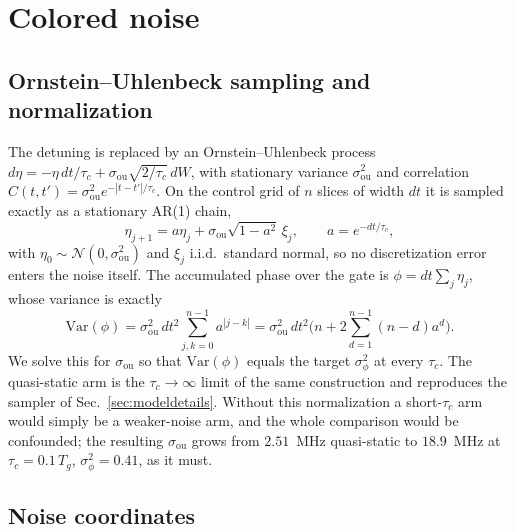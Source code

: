 \documentclass[aps,pra,onecolumn,notitlepage,superscriptaddress,nofootinbib,floatfix]{revtex4-2}
\begin{document}
\section{Colored noise}
\label{sec:stage4}

\subsection{Ornstein--Uhlenbeck sampling and normalization}

The detuning is replaced by an Ornstein--Uhlenbeck process
$d\eta=-\eta\,dt/\tau_c+\sigma_{\mathrm{ou}}\sqrt{2/\tau_c}\,dW$, with
stationary variance $\sigma_{\mathrm{ou}}^2$ and correlation
$C(t,t')=\sigma_{\mathrm{ou}}^2e^{-|t-t'|/\tau_c}$. On the control grid of
$n$ slices of width $dt$ it is sampled exactly as a stationary AR(1) chain,
\begin{equation}
\eta_{j+1}=a\eta_j+\sigma_{\mathrm{ou}}\sqrt{1-a^2}\,\xi_j,\qquad
a=e^{-dt/\tau_c},
\end{equation}
with $\eta_0\sim\mathcal N(0,\sigma_{\mathrm{ou}}^2)$ and $\xi_j$ i.i.d.\
standard normal, so no discretization error enters the noise itself. The
accumulated phase over the gate is $\phi=dt\sum_j\eta_j$, whose variance is
exactly
\begin{equation}
\mathrm{Var}(\phi)=\sigma_{\mathrm{ou}}^2\,dt^2\sum_{j,k=0}^{n-1}a^{|j-k|}
=\sigma_{\mathrm{ou}}^2\,dt^2\Big(n+2\!\!\sum_{d=1}^{n-1}\!(n-d)a^{d}\Big).
\end{equation}
We solve this for $\sigma_{\mathrm{ou}}$ so that $\mathrm{Var}(\phi)$ equals
the target $\sigma_\phi^2$ at every $\tau_c$. The quasi-static arm is the
$\tau_c\to\infty$ limit of the same construction and reproduces the sampler of
Sec.~\ref{sec:modeldetails}. Without this normalization a short-$\tau_c$ arm would simply
be a weaker-noise arm, and the whole comparison would be confounded; the
resulting $\sigma_{\mathrm{ou}}$ grows from $2.51$~MHz quasi-static to
$18.9$~MHz at $\tau_c=0.1\,T_g$, $\sigma_\phi^2=0.41$, as it must.

\subsection{Noise coordinates}
\end{document}
